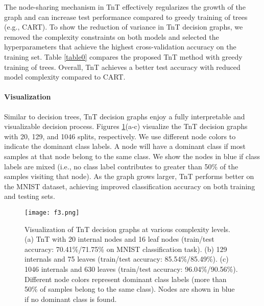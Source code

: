 \documentclass{article}
\begin{document}
The node-sharing mechanism in TnT effectively regularizes the growth of the graph and can increase test performance compared to greedy training of trees (e.g., CART). To show the reduction of variance in TnT decision graphs, we removed the complexity constraints on both models and selected the hyperparameters that achieve the highest cross-validation accuracy on the training set. Table \ref{table0} compares the proposed TnT method with greedy training of trees. Overall, TnT achieves a better test accuracy with reduced model complexity compared to CART.


\paragraph{Visualization} Similar to decision trees, TnT decision graphs enjoy a fully interpretable and visualizable decision process. Figures \ref{f5}(a-c) visualize the TnT decision graphs with 20, 129, and 1046 splits, respectively. We use different node colors to indicate the dominant class labels. A node will have a dominant class if most samples at that node belong to the same class. We show the nodes in blue if class labels are mixed (i.e., no class label contributes to greater than 50\% of the samples visiting that node). As the graph grows larger, TnT performs better on the MNIST dataset, achieving improved classification accuracy on both training and testing sets.

\begin{figure}[h]
  \centering
  \texttt{[image: f3.png]}
  \vspace{-2mm}
  \caption{Visualization of TnT decision graphs at various complexity levels. (a) TnT with 20 internal nodes and 16 leaf nodes (train/test accuracy: 70.41\%/71.75\% on MNIST classification task). (b) 129 internals and 75 leaves (train/test accuracy: 85.54\%/85.49\%). (c) 1046 internals and 630 leaves (train/test accuracy: 96.04\%/90.56\%). Different node colors represent dominant class labels (more than 50\% of samples belong to the same class). Nodes are shown in blue if no dominant class is found.}
  \vspace{-3mm}
  \label{f5}
\end{figure}



\vspace{-0mm}
\end{document}
